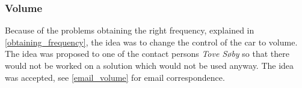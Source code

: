 \subsubsection{Volume}
Because of the problems obtaining the right frequency, explained in \cref{obtaining_frequency}, the idea was to change the control of the car to volume.
The idea was proposed to one of the contact persons \textit{Tove Søby} so that there would not be worked on a solution which would not be used anyway.
The idea was accepted, see \cref{email_volume} for email correspondence.